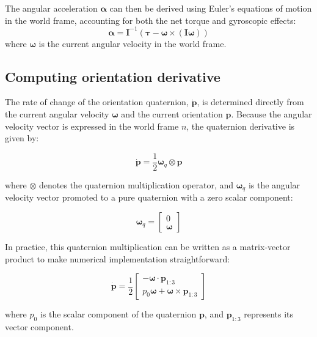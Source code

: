 \documentclass{article}
\begin{document}
	The angular acceleration $\boldsymbol{\alpha}$ can then be derived using Euler's equations of motion in the world frame, accounting for both the net torque and gyroscopic effects:
	\begin{equation}
		\boldsymbol{\alpha} = \mathbf{I}^{-1} \left( \boldsymbol{\tau} - \boldsymbol{\omega} \times (\mathbf{I} \boldsymbol{\omega}) \right)
	\end{equation}
	where $\boldsymbol{\omega}$ is the current angular velocity in the world frame.
	

\subsection{Computing orientation derivative}

The rate of change of the orientation quaternion, $\dot{\mathbf{p}}$, is determined directly from the current angular velocity $\boldsymbol{\omega}$ and the current orientation $\mathbf{p}$. Because the angular velocity vector is expressed in the world frame $n$, the quaternion derivative is given by:

\begin{equation}
	\dot{\mathbf{p}} = \frac{1}{2} \boldsymbol{\omega}_q \otimes \mathbf{p}
\end{equation}

where $\otimes$ denotes the quaternion multiplication operator, and $\boldsymbol{\omega}_q$ is the angular velocity vector promoted to a pure quaternion with a zero scalar component:

\begin{equation}
	\boldsymbol{\omega}_q = 
	\begin{bmatrix}
		0 \\
		\boldsymbol{\omega}
	\end{bmatrix}
\end{equation}

In practice, this quaternion multiplication can be written as a matrix-vector product to make numerical implementation straightforward:

\begin{equation}
	\dot{\mathbf{p}} = \frac{1}{2}
	\begin{bmatrix}
		-\boldsymbol{\omega} \cdot \mathbf{p}_{1:3} \\
		p_0 \boldsymbol{\omega} + \boldsymbol{\omega} \times \mathbf{p}_{1:3}
	\end{bmatrix}
\end{equation}

where $p_0$ is the scalar component of the quaternion $\mathbf{p}$, and $\mathbf{p}_{1:3}$ represents its vector component.
\end{document}
